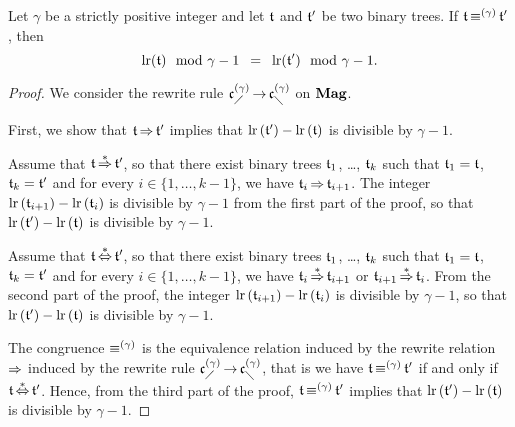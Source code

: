 \begin{Lemma}\label{lem:left_rank_and_CongrCAs}
    Let $\gamma$ be a strictly positive integer and let $\mathfrak{t}$ and
    $\mathfrak{t}'$ be two binary trees. If $\mathfrak{t} \operatorname{\equiv}^{(\gamma)} \mathfrak{t}'$, then
    \begin{equation}
        \mathrm{lr}(\mathfrak{t}) \mod \gamma - 1
        \enspace = \enspace
        \mathrm{lr}(\mathfrak{t}') \mod \gamma - 1.
    \end{equation}
\end{Lemma}
\begin{proof}
  We consider the rewrite rule $\mathfrak{c}^{(\gamma)}_{\diagup} \operatorname{\to} \mathfrak{c}^{(\gamma)}_{\diagdown}$ on
  $\mathbf{Mag}$. 
    \smallbreak

    First, we show that $\mathfrak{t} \operatorname{\Rightarrow} \mathfrak{t}'$ implies that
    $\mathrm{lr}\left(\mathfrak{t}'\right) - \mathrm{lr}\left(\mathfrak{t}\right)$ is
    divisible by $\gamma - 1$. 
    \smallbreak

    Assume that $\mathfrak{t} \operatorname{\overset{\ast}{\operatorname{\Rightarrow}}} \mathfrak{t}'$, so that there exist binary trees
    $\mathfrak{t}_1$, \dots, $\mathfrak{t}_k$ such that $\mathfrak{t}_1 = \mathfrak{t}$,
    $\mathfrak{t}_k = \mathfrak{t}'$ and for every $i \in \{1, \dots, k - 1\}$, we have
    $\mathfrak{t}_i\operatorname{\Rightarrow} \mathfrak{t}_{i + 1}$. The integer
    \begin{math}
        \mathrm{lr}\left(\mathfrak{t}_{i + 1}\right)
        -
        \mathrm{lr}\left(\mathfrak{t}_i\right)
    \end{math}
    is divisible by $\gamma - 1$ from the first part of the proof, so
    that $\mathrm{lr}\left(\mathfrak{t}'\right) - \mathrm{lr}\left(\mathfrak{t}\right)$ is
    divisible by $\gamma-1$.
    \smallbreak

    Assume that $\mathfrak{t} \operatorname{\overset{\ast}{\Leftrightarrow}} \mathfrak{t}'$, so that there exist binary trees
    $\mathfrak{t}_1$, \dots, $\mathfrak{t}_k$ such that $\mathfrak{t}_1 = \mathfrak{t}$,
    $\mathfrak{t}_k = \mathfrak{t}'$ and for every $i \in \{1, \dots, k - 1\}$, we have
    $\mathfrak{t}_i \operatorname{\overset{\ast}{\operatorname{\Rightarrow}}} \mathfrak{t}_{i + 1}$ or $\mathfrak{t}_{i + 1} \operatorname{\overset{\ast}{\operatorname{\Rightarrow}}}
    \mathfrak{t}_i$. From the second part of the proof, the integer
    \begin{math}
        \mathrm{lr}\left(\mathfrak{t}_{i + 1}\right)
        -
        \mathrm{lr}\left(\mathfrak{t}_i\right)
    \end{math}
    is divisible by $\gamma - 1$, so that
    $\mathrm{lr}\left(\mathfrak{t}'\right) - \mathrm{lr}\left(\mathfrak{t}\right)$ is
    divisible by $\gamma - 1$.
    \smallbreak

    The congruence $\operatorname{\equiv}^{(\gamma)}$ is the equivalence relation
    induced by the rewrite relation $\operatorname{\Rightarrow}$ induced by the rewrite
    rule $\mathfrak{c}^{(\gamma)}_{\diagup} \operatorname{\to} \mathfrak{c}^{(\gamma)}_{\diagdown}$, that is we have $\mathfrak{t}
    \operatorname{\equiv}^{(\gamma)} \mathfrak{t}'$ if and only if $\mathfrak{t} \operatorname{\overset{\ast}{\Leftrightarrow}} \mathfrak{t}'$.
    Hence, from the third part of the proof, $\mathfrak{t} \operatorname{\equiv}^{(\gamma)}
    \mathfrak{t}'$ implies that
    \begin{math}
        \mathrm{lr}\left(\mathfrak{t}'\right) - \mathrm{lr}\left(\mathfrak{t}\right)
    \end{math}
    is divisible by $\gamma - 1$.
\end{proof}
\medbreak

